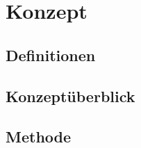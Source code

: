 \cleardoublepage
\chapter{Konzept}
\label{ch:Konzept}

\section{Definitionen}
\label{sec:Def}

\section{Konzeptüberblick}
\label{sec:Konzeptueberblick}

\section{Methode}
\label{sec:Methode}
